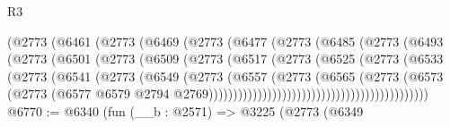 \begin{lexlean}{R3}
\begin{coremodule}
                              (@2773
                                (@6461
                                  (@2773
                                    (@6469
                                      (@2773
                                        (@6477
                                          (@2773
                                            (@6485
                                              (@2773
                                                (@6493
                                                  (@2773
                                                    (@6501
                                                      (@2773
                                                        (@6509
                                                          (@2773
                                                            (@6517
                                                              (@2773
                                                                (@6525
                                                                  (@2773
                                                                    (@6533
                                                                      (@2773
                                                                        (@6541
                                                                          (@2773
                                                                            (@6549
                                                                              (@2773
                                                                                (@6557
                                                                                  (@2773
                                                                                    (@6565
                                                                                      (@2773
                                                                                        (@6573
                                                                                          (@2773
                                                                                            (@6577
                                                                                              @6579
                                                                                              @2794
                                                                                              @2769)))))))))))))))))))))))))))))))))))))))))))))
@6770 := @6340
    (fun (__b : @2571) =>
    @3225
      (@2773
        (@6349

\end{coremodule}
\end{lexlean}
